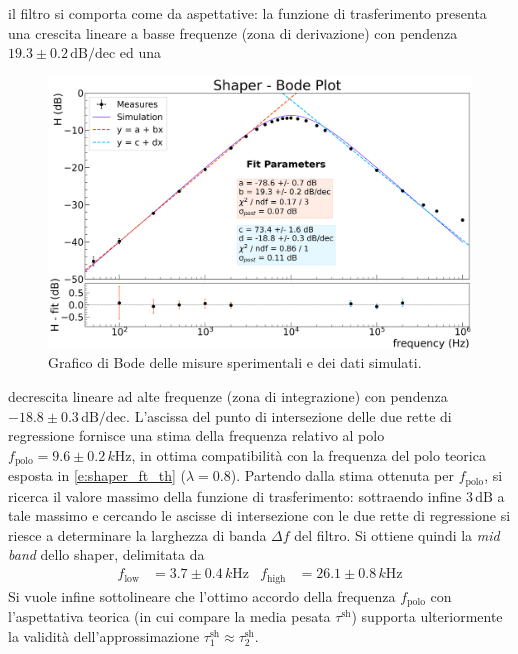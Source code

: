 \documentclass[a4paper,11pt]{article} %
\begin{document}
il filtro si comporta come da aspettative: la funzione di trasferimento presenta una crescita lineare a basse frequenze
(zona di derivazione) con pendenza $19.3 \pm 0.2 \,\text{dB/dec}$ ed una \newpage
\begin{figure}[H]
	\centering
	\includegraphics[width=0.9\linewidth]{../Plots/Shaper/bode_plot.png}
	\caption{\small Grafico di Bode delle misure sperimentali e dei dati simulati.}
	\label{i:shaper_thebode}
\end{figure}
\noindent  decrescita lineare ad alte frequenze (zona di integrazione) con pendenza $-18.8 \pm 0.3 \,\text{dB/dec}$.
L'ascissa del punto di intersezione delle due rette di regressione fornisce una stima della frequenza relativo al polo
$f_{\text{polo}} = 9.6 \pm 0.2 \,\si{k\Hz}$, in ottima compatibilità con la frequenza del polo teorica esposta in
\autoref{e:shaper_ft_th} ($\lambda = 0.8$). Partendo dalla stima ottenuta per $f_{\text{polo}}$, si ricerca il valore
massimo della funzione di trasferimento: sottraendo infine $3\,\text{dB}$ a tale massimo e cercando le ascisse di
intersezione con le due rette di regressione si riesce a determinare la larghezza di banda $\Delta f$ del filtro. Si
ottiene quindi la \textit{mid band} dello shaper, delimitata da
\begin{align}\label{e:shaper_bw}
	f_{\text{low}} &= 3.7 \pm 0.4 \,\si{k\Hz} &
	f_{\text{high}} &= 26.1 \pm 0.8\,\si{k\Hz}
\end{align}
\noindent Si vuole infine sottolineare che l'ottimo accordo della frequenza $f_{\text{polo}}$ con l'aspettativa teorica
(in cui compare la media pesata $\tau^{\text{sh}}$) supporta ulteriormente la validità dell'approssimazione
$\tau^{\text{sh}}_1 \approx \tau^{\text{sh}}_2$.

\end{document}
